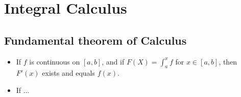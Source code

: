 \section{Integral Calculus}

\subsection{Fundamental theorem of Calculus}
\begin{itemize}
\item
	If $f$ is continuous on $[a, b]$, and if $F(X)=\int_a^x f$
	for $x\in[a,b]$, then $F'(x)$ exists and equals $f(x)$.
\item
	If ...
\end{itemize}
